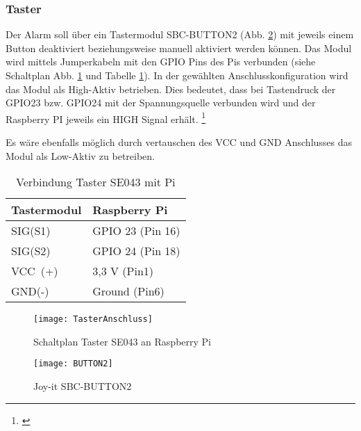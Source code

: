 \subsubsection{Taster}

Der Alarm soll über ein Tastermodul SBC-BUTTON2 (Abb. \ref{BUTTON2}) mit jeweils einem Button deaktiviert beziehungsweise manuell aktiviert werden können.
Das Modul wird mittels Jumperkabeln mit den GPIO Pins des Pis verbunden (siehe Schaltplan Abb. \ref{TasterAnschluss} und Tabelle \ref{TasterTabelle}). 
In der gewählten Anschlusskonfiguration wird das Modul als High-Aktiv betrieben. Dies bedeutet, dass bei Tastendruck der GPIO23 bzw. GPIO24 mit der Spannungsquelle verbunden wird und der Raspberry PI jeweils ein HIGH Signal erhält. \footnote{\cite{.19.04.2022}}\par 
Es wäre ebenfalls möglich durch vertauschen des VCC und GND Anschlusses das Modul als Low-Aktiv zu betreiben.

\begin{table}[H]
	\centering
	\begin{tabular}{|p{5cm}|p{5cm}|} 
		\hline
		Tastermodul & Raspberry Pi\\ 
		\hline
		SIG(S1)                   & GPIO 23 \hspace{0,3cm}(Pin 16)\\
		\hline
		SIG(S2)                   & GPIO 24 \hspace{0,3cm}(Pin 18)\\
		\hline
		VCC~(+)   & 3,3 V \hspace{1cm}(Pin\hspace{0,35cm}1)\\ 
		\hline
		GND(-)                   & Ground \hspace{0,6cm}(Pin\hspace{0,35cm}6)\\
		\hline
		
\end{tabular}
	\caption{Verbindung Taster SE043 mit Pi}
	\label{TasterTabelle}
\end{table}

	\begin{figure}[H]
	\centering
	\texttt{[image: TasterAnschluss]}
	\caption{Schaltplan Taster SE043 an Raspberry Pi}
	\label{TasterAnschluss}
	\end{figure}

	\begin{figure}[h] %
	\centering
	\texttt{[image: BUTTON2]}
	\caption{Joy-it SBC-BUTTON2 \cite{reicheltelektronikGmbH&amp.21.04.2022b}}
	\label{BUTTON2}
	\end{figure}

